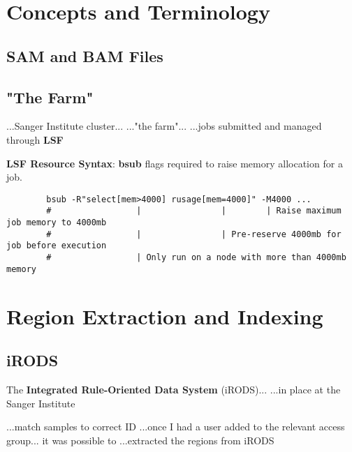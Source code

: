 \section{Concepts and Terminology}

\subsection{SAM and BAM Files}

\subsection{"The Farm"}

...Sanger Institute cluster...
..."the farm"...
...jobs submitted and managed through \textbf{LSF}

\begin{listing}[H]
    \caption[lsf-memory]{\textbf{LSF Resource Syntax}: \textbf{bsub} flags
        required to raise memory allocation for a job.}
    \label{list:lsf-memory}
    \begin{verbatim}
        bsub -R"select[mem>4000] rusage[mem=4000]" -M4000 ...
        #                 |                |        | Raise maximum job memory to 4000mb
        #                 |                | Pre-reserve 4000mb for job before execution
        #                 | Only run on a node with more than 4000mb memory
    \end{verbatim}
\end{listing}



\section{Region Extraction and Indexing}
\subsection{iRODS}

The \textbf{Integrated Rule-Oriented Data System} (iRODS)...
...in place at the
Sanger Institute\citep{irods-sanger}

...match samples to correct ID
...once I had a user added to the relevant access group... it was possible to 
...extracted the regions from iRODS

